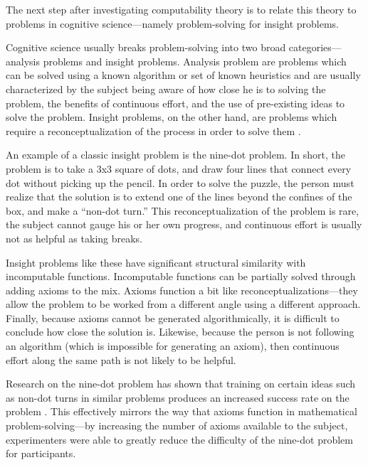 The next step after investigating computability theory is to relate this theory to problems in cognitive science---namely problem-solving for insight problems.

Cognitive science usually breaks problem-solving into two broad categories---analysis problems and insight problems.  Analysis problem are problems which can be solved using a known algorithm or set of known heuristics and are usually characterized by the subject being aware of how close he is to solving the problem, the benefits of continuous effort, and the use of pre-existing ideas to solve the problem.  Insight problems, on the other hand, are problems which require a reconceptualization of the process in order to solve them \citep{chronicleetal2004}. 

An example of a classic insight problem is the nine-dot problem.  In short, the problem is to take a 3x3 square of dots, and draw four lines that connect every dot without picking up the pencil.  In order to solve the puzzle, the person must realize that the solution is to extend one of the lines beyond the confines of the box, and make a ``non-dot turn.''  This reconceptualization of the problem is rare, the subject cannot gauge his or her own progress, and continuous effort is usually not as helpful as taking breaks.

Insight problems like these have significant structural similarity with incomputable functions.  Incomputable functions can be partially solved through adding axioms to the mix.  Axioms function a bit like reconceptualizations---they allow the problem to be worked from a different angle using a different approach.  Finally, because axioms cannot be generated algorithmically, it is difficult to conclude how close the solution is.  Likewise, because the person is not following an algorithm (which is impossible for generating an axiom), then continuous effort along the same path is not likely to be helpful.

Research on the nine-dot problem has shown that training on certain ideas such as non-dot turns in similar problems produces an increased success rate on the problem \citep{kershawandohlsson2001, kershaw2004}.  This effectively mirrors the way that axioms function in mathematical problem-solving---by increasing the number of axioms available to the subject, experimenters were able to greatly reduce the difficulty of the nine-dot problem for participants.

